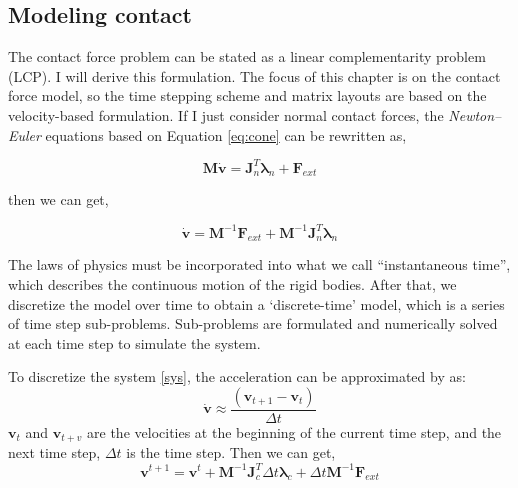 \subsection{Modeling contact}
    The contact force problem can be stated as a linear complementarity problem (LCP)\cite{bender2014interactive}. I will derive this formulation. The focus of this chapter is on the contact force model, so the time stepping scheme and matrix layouts are based on the velocity-based formulation. If I just consider normal contact forces, the \textit{Newton–Euler} equations based on Equation \ref{eq:cone} can be rewritten as,

    \begin{equation}
        \pmb{M}\dot{\mathbf{v}} = \pmb{J}_{n}^{T}\pmb{\lambda}_n + \mathbf{F}_{ext}
    \end{equation}

    then we can get,

    \begin{equation}
        \dot{\mathbf{v}} = \pmb{M}^{-1}\mathbf{F}_{ext} + \pmb{M}^{-1}\pmb{J}_{n}^{T}\pmb{\lambda}_{n}
        \label{sys}
    \end{equation}

    The laws of physics must be incorporated into what we call ``instantaneous time'', which describes the continuous motion of the rigid bodies. After that, we discretize the model over time to obtain a `discrete-time' model, which is a series of time step sub-problems. Sub-problems are formulated and numerically solved at each time step to simulate the system.
    
    To discretize the system \ref{sys}, the acceleration can be approximated by \cite{anitescu1997modeling} as:
    \begin{equation}
        \dot{\mathbf{v}} \approx \frac{(\mathbf{v}_{t+1} - \mathbf{v}_t)}{\Delta t}
    \end{equation}
    $\mathbf{v}_t$ and $\mathbf{v}_{t+v}$ are the velocities at the beginning of the current time step, and the next time step, $\Delta t$ is the time step. Then we can get,
    \begin{equation}
        \mathbf{v}^{t+1} = \mathbf{v}^{t} + \pmb{M}^{-1}\pmb{J}_{c}^{T}\Delta{t}\pmb{\lambda}_{c} + \Delta{t}\pmb{M}^{-1}\mathbf{F}_{ext}
    \end{equation}

